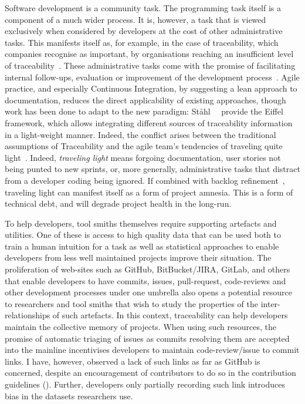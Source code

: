Software development is a community task. The programming task itself is a
component of a much wider process. It is, however, a task that is viewed
exclusively when considered by developers at the cost of other administrative
tasks. This manifests itself as, for example, in the case of traceability, which
companies recognise as important, by organisations reaching an insufficient
level of traceability~\cite{mader2009motivation}. These administrative tasks
come with the promise of facilitating internal follow-ups, evaluation or
improvement of the development process~\cite{domges1998adapting}. Agile
practice, and especially Continuous Integration, by suggesting a lean approach
to documentation, reduces the direct applicability of existing approaches,
though work has been done to adapt to the new paradigm:
Ståhl~\etal~\cite{Stahl2017} provide the Eiffel framework, which allows
integrating different sources of traceability information in a light-weight
manner. Indeed, the conflict arises between the traditional assumptions of
Traceability and the agile team's tendencies of traveling quite
light~\cite{Cleland-Huang2014}. Indeed, \emph{traveling light} means forgoing
documentation, user stories not being punted to new sprints, or, more generally,
administrative tasks that distract from a developer coding being ignored. If
combined with backlog refinement~\cite{BacklogRefinement}, traveling light can
manifest itself as a form of project amnesia. This is a form of technical debt,
and will degrade project health in the long-run.

To help developers, tool smiths themselves require supporting artefacts and
utilities. One of these is access to high quality data that can be used both to
train a human intuition for a task as well as statistical approaches to enable
developers from less well maintained projects improve their situation. The
proliferation of web-sites such as GitHub, BitBucket/JIRA, GitLab, and others
that enable developers to have commits, issues, pull-request, code-reviews and
other development processes under one umbrella also opens a potential resource
to researchers and tool smiths that wish to study the properties of the
inter-relationships of such artefacts. In this context, traceability can help
developers maintain the collective memory of projects. When using such
resources, the promise of automatic triaging of issues as commits resolving them
are accepted into the mainline incentivises developers to maintain
code-review/issue to commit links. I have, however, observed a lack of such
links as far as GitHub is concerned, despite an encouragement of contributors to
do so in the contribution guidelines (). Further,
developers only partially recording such link introduces bias in the datasets
researchers use.

